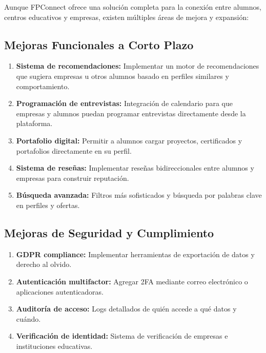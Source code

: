 \documentclass[a4paper]{report}
\begin{document}
Aunque FPConnect ofrece una solución completa para la conexión entre alumnos, centros educativos y empresas, existen múltiples áreas de mejora y expansión:

\subsection*{Mejoras Funcionales a Corto Plazo}

\begin{enumerate}
  \item \textbf{Sistema de recomendaciones:} Implementar un motor de recomendaciones que sugiera empresas u otros alumnos basado en perfiles similares y comportamiento.
  
  \item \textbf{Programación de entrevistas:} Integración de calendario para que empresas y alumnos puedan programar entrevistas directamente desde la plataforma.
  
  \item \textbf{Portafolio digital:} Permitir a alumnos cargar proyectos, certificados y portafolios directamente en su perfil.
  
  \item \textbf{Sistema de reseñas:} Implementar reseñas bidireccionales entre alumnos y empresas para construir reputación.
  
  \item \textbf{Búsqueda avanzada:} Filtros más sofisticados y búsqueda por palabras clave en perfiles y ofertas.
\end{enumerate}

\subsection*{Mejoras de Seguridad y Cumplimiento}

\begin{enumerate}
  \item \textbf{GDPR compliance:} Implementar herramientas de exportación de datos y derecho al olvido.
  
  \item \textbf{Autenticación multifactor:} Agregar 2FA mediante correo electrónico o aplicaciones autenticadoras.
  
  \item \textbf{Auditoría de acceso:} Logs detallados de quién accede a qué datos y cuándo.
  
  \item \textbf{Verificación de identidad:} Sistema de verificación de empresas e instituciones educativas.
\end{enumerate}
\end{document}
